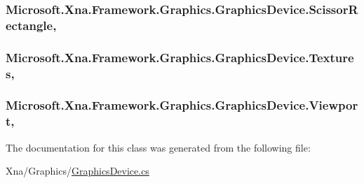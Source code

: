\subsubsection[{Scissor\+Rectangle}]{ Microsoft.\+Xna.\+Framework.\+Graphics.\+Graphics\+Device.\+Scissor\+Rectangle\hspace{0.3cm}{\ttfamily [get]}, {\ttfamily [set]}}\label{class_microsoft_1_1_xna_1_1_framework_1_1_graphics_1_1_graphics_device_a0d806581a765ad2e2070358171e97f33}
\hypertarget{class_microsoft_1_1_xna_1_1_framework_1_1_graphics_1_1_graphics_device_a9499987642fb2c89de6667660c35e34f}{}
\subsubsection[{Textures}]{ Microsoft.\+Xna.\+Framework.\+Graphics.\+Graphics\+Device.\+Textures\hspace{0.3cm}{\ttfamily [get]}, {\ttfamily [set]}}\label{class_microsoft_1_1_xna_1_1_framework_1_1_graphics_1_1_graphics_device_a9499987642fb2c89de6667660c35e34f}
\hypertarget{class_microsoft_1_1_xna_1_1_framework_1_1_graphics_1_1_graphics_device_ac69eefa1690b3160dd1bcc35ce448046}{}
\subsubsection[{Viewport}]{ Microsoft.\+Xna.\+Framework.\+Graphics.\+Graphics\+Device.\+Viewport\hspace{0.3cm}{\ttfamily [get]}, {\ttfamily [set]}}\label{class_microsoft_1_1_xna_1_1_framework_1_1_graphics_1_1_graphics_device_ac69eefa1690b3160dd1bcc35ce448046}


The documentation for this class was generated from the following file\+:\begin{DoxyCompactItemize}
\item 
Xna/\+Graphics/\hyperlink{_graphics_device_8cs}{Graphics\+Device.\+cs}\end{DoxyCompactItemize}
